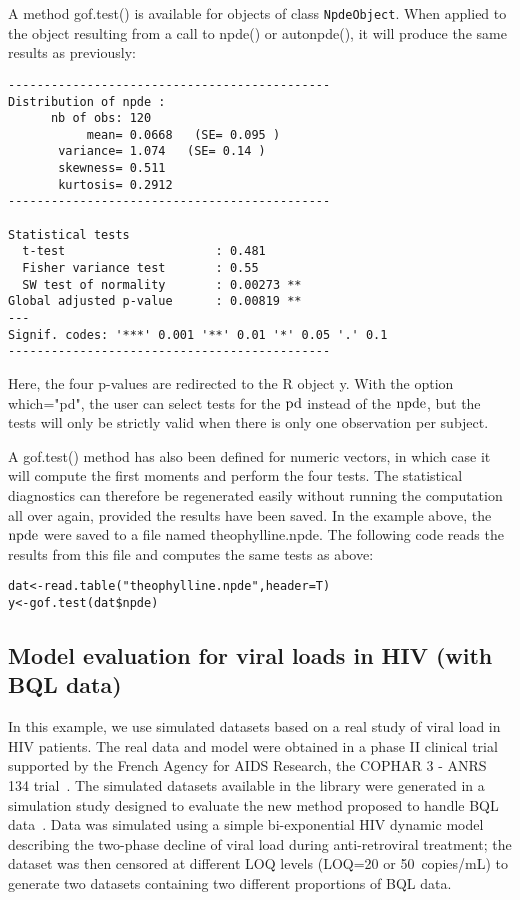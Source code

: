 \hskip 18pt A method {\sf gof.test()} is available for objects of class \texttt{NpdeObject}. When applied to the object resulting from a call to {\sf npde()} or {\sf autonpde()}, it will produce the same results as previously:
\begin{verbatim}
---------------------------------------------
Distribution of npde :
      nb of obs: 120 
           mean= 0.0668   (SE= 0.095 )
       variance= 1.074   (SE= 0.14 )
       skewness= 0.511 
       kurtosis= 0.2912 
---------------------------------------------

Statistical tests
  t-test                     : 0.481
  Fisher variance test       : 0.55
  SW test of normality       : 0.00273 **
Global adjusted p-value      : 0.00819 **
---
Signif. codes: '***' 0.001 '**' 0.01 '*' 0.05 '.' 0.1 
---------------------------------------------
\end{verbatim}
Here, the four p-values are redirected to the R object {\sf y}. With the option {\sf which="pd"}, the user can select tests for the ${\rm pd}$ instead of the ${\rm npde}$, but the tests will only be strictly valid when there is only one observation per subject.

A {\sf gof.test()} method has also been defined for numeric vectors, in which case it will compute the first moments and perform the four tests. The statistical diagnostics can therefore be regenerated easily without running the computation all over again, provided the results have been saved. In the example above, the ${\rm npde}$ were saved to a file named {\sf theophylline.npde}. The following code reads the results from this file and computes the same tests as above:
\begin{verbatim}
dat<-read.table("theophylline.npde",header=T)
y<-gof.test(dat$npde) 
\end{verbatim}


\clearpage

\subsection{Model evaluation for viral loads in HIV (with BQL data)} \label{sec:PDexample}

\hskip 18pt In this example, we use simulated datasets based on a real study of viral load in HIV patients. The real data and model were obtained in a phase II clinical trial supported by the French Agency for AIDS Research, the COPHAR 3 - ANRS 134 trial~\cite{GoujardISA2010}. The simulated datasets available in the library were generated in a simulation study designed to evaluate the new method proposed to handle BQL data~\cite{Nguyen2012}. Data was simulated using a simple bi-exponential HIV dynamic model describing the two-phase decline of viral load during anti-retroviral treatment; the dataset was then censored at different LOQ levels (LOQ=20 or 50~copies/mL) to generate two datasets containing two different proportions of BQL data.

